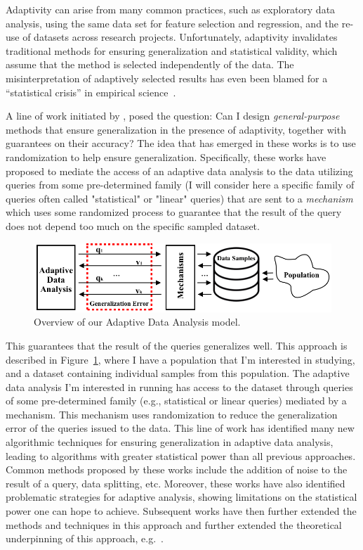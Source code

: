  Adaptivity can arise from many common practices, such as exploratory data analysis, using the same data set for feature selection and regression, and the re-use of datasets across research projects. Unfortunately, adaptivity invalidates traditional methods for ensuring generalization and statistical validity, which assume that the method is selected independently of the data. The misinterpretation of adaptively selected results has even been blamed for a ``statistical crisis'' in empirical science~\cite{GelmanL13}.

A line of work initiated by \cite{DworkFHPRR15}, \cite{HardtU14} posed the question: Can I design \emph{general-purpose} methods that ensure generalization in the presence of adaptivity, together with guarantees on their accuracy? 
The idea that has emerged in these works is to use randomization to help ensure generalization. 
Specifically, these works have proposed to mediate the access of an adaptive data analysis to the data utilizing queries from some pre-determined family (I will consider here a specific family of queries often called "statistical" or "linear" queries) that are sent to a 
\emph{mechanism} which uses some randomized process to guarantee that the result of the query does not depend too much on the specific
sampled dataset. 
%
\begin{figure}
 \centering
 \includegraphics[width=0.7\columnwidth]{figures/data_analysis_model.png}
 \caption{Overview of our Adaptive Data Analysis model.}
 \label{fig:adaptivity-model-overview}
\vspace{-0.5cm}
\end{figure}
This guarantees that the result of the queries generalizes well. 
This approach is described in Figure~\ref{fig:adaptivity-model-overview}, where
I have a population that I'm interested in studying, and a dataset containing individual samples from this population. The adaptive data analysis I'm interested in running has access to the dataset through queries of some pre-determined family (e.g., statistical or linear queries) mediated by a mechanism. 
This mechanism uses randomization to reduce the generalization error of the queries issued to the data.
This line of work has identified many new algorithmic techniques for ensuring generalization in adaptive data analysis, leading to algorithms with greater statistical power than all previous approaches. 
Common methods proposed by these works include the addition of noise to the result of a query, data splitting, etc. 
Moreover, these works have also identified problematic strategies for adaptive analysis, showing limitations on the statistical power one can hope to achieve. 
Subsequent works have then further extended the methods and techniques in this approach and further extended the theoretical underpinning of this approach, 
e.g.~\cite{dwork2015reusable,dwork2015generalization,BassilyNSSSU16,UllmanSNSS18,FeldmanS17,jung2019new,SteinkeZ20,RogersRSSTW20}.
%

